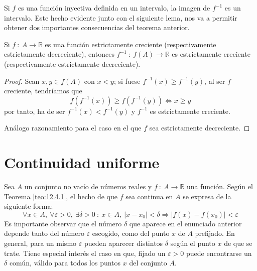 Si $f$ es una función inyectiva definida en un intervalo, la imagen de $f^{-1}$ es un intervalo. Este hecho evidente junto con el
siguiente lema, nos va a permitir obtener dos importantes consecuencias del teorema anterior.
\begin{lema}
    Si $f ~:~ A \longrightarrow \mathbb{R}$ es una función estrictamente creciente (respectivamente estrictamente decreciente), entonces $f^{-1} ~:~ f(A) \longrightarrow \mathbb{R}$ es estrictamente creciente (respectivamente estrictamente decreciente).
\end{lema}
\begin{proof}
    Sean $x,y \in f(A)$ con $x < y$; si fuese $f^{-1}(x) \geq f^{-1}(y)$, al ser $f$ creciente, tendríamos que
    \begin{equation*}
        f(f^{-1}(x)) \geq f(f^{-1}(y)) \Longleftrightarrow x \geq y
    \end{equation*}
    por tanto, ha de ser $f^{-1}(x) < f^{-1}(y)$ y $f^{-1}$ es estrictamente creciente.

    Análogo razonamiento para el caso en el que $f$ sea estrictamente decreciente.
\end{proof}


\section{Continuidad uniforme}
Sea $A$ un conjunto no vacío de números reales y $f ~:~ A \longrightarrow \mathbb{R}$ una función.
Según el Teorema \ref{teo:12.4.1}, el hecho de que $f$ sea continua en $A$ se expresa de la siguiente forma:
\begin{equation*}
    \forall x \in A, ~ \forall \varepsilon > 0, ~ \exists \delta > 0 ~:~ x \in A, ~ |x-x_0| < \delta \Longrightarrow |f(x)-f(x_0)| < \varepsilon
\end{equation*}
Es importante observar que el número $\delta$ que aparece en el enunciado anterior depende tanto del número $\varepsilon$ escogido, como del punto $x$ de $A$ prefijado. En general, para un mismo $\varepsilon$ pueden aparecer distintos $\delta$ según el punto $x$ de que se trate. Tiene especial interés el caso en que, fijado un $\varepsilon > 0$ puede encontrarse un $\delta$ común, válido para todos los puntos $x$ del conjunto $A$.

